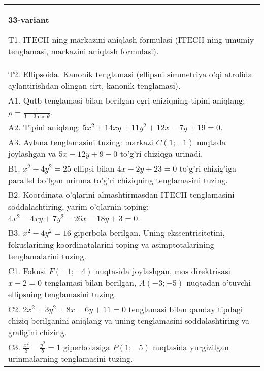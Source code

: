 \documentclass{article}
\begin{document}
\begin{tabular}{m{17cm}}
\textbf{33-variant}
\newline

T1. ITECH-ning markazini aniqlash formulasi (ITECH-ning umumiy tenglamasi, markazini aniqlash formulasi).\\

T2. Ellipsoida. Kanonik tenglamasi (ellipsni simmetriya o'qi atrofida aylantirishdan olingan sirt, kanonik tenglamasi).\\

A1. Qutb tenglamasi bilan berilgan egri chiziqning tipini aniqlang: $\rho=\frac{1}{3-3\cos\theta}$.\\

A2. Tipini aniqlang: $5x^{2}+14xy+11y^{2}+12x-7y+19=0$.\\

A3. Aylana tenglamasini tuzing: markazi $C(1;-1)$ nuqtada joylashgan va $5x-12y+9-0$ to'g'ri chiziqga urinadi.\\

B1. $x^{2} + 4y^{2} = 25$ ellipsi bilan $4x - 2y + 23 = 0$ to'g'ri chizig'iga parallel bo'lgan urinma to'g'ri chiziqning tenglamasini tuzing.  \\

B2. Koordinata o'qlarini almashtirmasdan ITECH tenglamasini soddalashtiring, yarim o'qlarnin toping: $4x^{2} - 4xy + 7y^{2} - 26x - 18y + 3 = 0$.\\

B3. $x^{2} - 4y^{2} = 16$ giperbola berilgan. Uning ekssentrisitetini, fokuslarining koordinatalarini toping va asimptotalarining tenglamalarini tuzing.\\

C1. Fokusi $F( - 1; - 4)$ nuqtasida joylashgan, mos direktrisasi $x - 2 = 0$ tenglamasi bilan berilgan, $A( - 3; - 5)$ nuqtadan o'tuvchi ellipsning tenglamasini tuzing.  \\

C2. $2x^{2} + 3y^{2} + 8x - 6y + 11 = 0$ tenglamasi bilan qanday tipdagi chiziq berilganini aniqlang va uning tenglamasini soddalashtiring va grafigini chizing.  \\

C3. $\frac{x^{2}}{3} - \frac{y^{2}}{5} = 1$ giperbolasiga $P(1; - 5)$ nuqtasida yurgizilgan urinmalarning tenglamasini tuzing.\\

\end{tabular}
\vspace{1cm}
\end{document}
